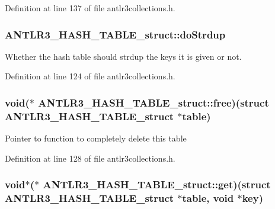 Definition at line 137 of file antlr3collections.\-h.

\hypertarget{struct_a_n_t_l_r3___h_a_s_h___t_a_b_l_e__struct_a5df7e657735afc6d734834aa9f5c51d7}{
\subsubsection[{do\-Strdup}]{ A\-N\-T\-L\-R3\-\_\-\-H\-A\-S\-H\-\_\-\-T\-A\-B\-L\-E\-\_\-struct\-::do\-Strdup}}\label{struct_a_n_t_l_r3___h_a_s_h___t_a_b_l_e__struct_a5df7e657735afc6d734834aa9f5c51d7}
Whether the hash table should strdup the keys it is given or not. 

Definition at line 124 of file antlr3collections.\-h.

\hypertarget{struct_a_n_t_l_r3___h_a_s_h___t_a_b_l_e__struct_ad0d70d7b01ab03dd2bc74246c6c3432a}{
\subsubsection[{free}]{\setlength{\rightskip}{0pt plus 5cm}void($\ast$ A\-N\-T\-L\-R3\-\_\-\-H\-A\-S\-H\-\_\-\-T\-A\-B\-L\-E\-\_\-struct\-::free)(struct {\bf A\-N\-T\-L\-R3\-\_\-\-H\-A\-S\-H\-\_\-\-T\-A\-B\-L\-E\-\_\-struct} $\ast$table)}}\label{struct_a_n_t_l_r3___h_a_s_h___t_a_b_l_e__struct_ad0d70d7b01ab03dd2bc74246c6c3432a}
Pointer to function to completely delete this table 

Definition at line 128 of file antlr3collections.\-h.

\hypertarget{struct_a_n_t_l_r3___h_a_s_h___t_a_b_l_e__struct_ade55b338983760e1a32075c09268a3ce}{
\subsubsection[{get}]{\setlength{\rightskip}{0pt plus 5cm}void$\ast$($\ast$ A\-N\-T\-L\-R3\-\_\-\-H\-A\-S\-H\-\_\-\-T\-A\-B\-L\-E\-\_\-struct\-::get)(struct {\bf A\-N\-T\-L\-R3\-\_\-\-H\-A\-S\-H\-\_\-\-T\-A\-B\-L\-E\-\_\-struct} $\ast$table, void $\ast$key)}}\label{struct_a_n_t_l_r3___h_a_s_h___t_a_b_l_e__struct_ade55b338983760e1a32075c09268a3ce}


